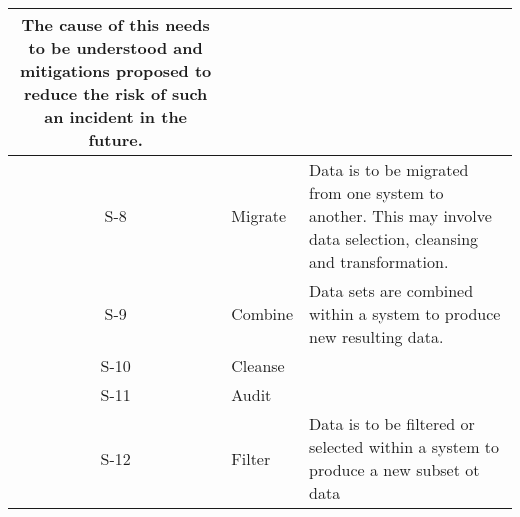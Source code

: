 \begin{longtable}{|C{}|L{}|L{}|}
	The cause of this needs to be understood and mitigations proposed to reduce the risk of such an incident in the future.\\
	\hline
	S-8 & Migrate & Data is to be migrated from one system to another. This may involve data selection, cleansing and transformation. \\
	\hline
	S-9 & Combine & Data sets are combined within a system to produce new resulting data.\\
	\hline
	S-10 & Cleanse & \\
	\hline
	S-11 & Audit & \\
	\hline
	S-12 & Filter & Data is to be filtered or selected within a system to produce a new subset ot data\\
	\hline
\end{longtable}

